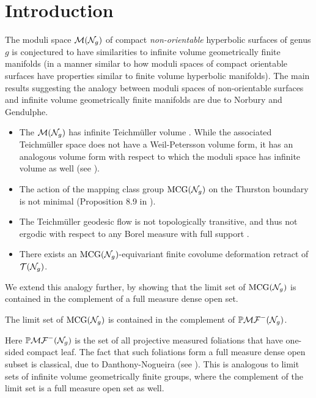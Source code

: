 \section{Introduction}
\label{sec:introduction-v2}

The moduli space $\mathcal{M}(\mathcal{N}_g)$ of compact \emph{non-orientable} hyperbolic surfaces of genus $g$ is conjectured to have similarities to infinite volume geometrically finite manifolds (in a manner similar to how moduli spaces of compact orientable surfaces have properties similar to finite volume hyperbolic manifolds).
The main results suggesting the analogy between moduli spaces of non-orientable surfaces and infinite volume geometrically finite manifolds are due to Norbury and Gendulphe.

\begin{itemize}
\item The $\mathcal{M}(\mathcal{N}_g)$ has infinite Teichm\"uller volume \cite[Theorem 17.1]{gendulphe2017whats}.
  While the associated Teichm\"uller space does not have a Weil-Petersson volume form, it has an analogous volume form with respect to which the moduli space has infinite volume as well (see \cite{norbury2008lengths}).
\item The action of the mapping class group $\mathrm{MCG}(\mathcal{N}_g)$ on the Thurston boundary is not minimal (Proposition 8.9 in \cite{gendulphe2017whats}).
\item The Teichm\"uller geodesic flow is not topologically transitive, and thus not ergodic with respect to any Borel measure with full support \cite[Proposition 17.5]{gendulphe2017whats}.
\item There exists an $\mathrm{MCG}(\mathcal{N}_g)$-equivariant finite covolume deformation retract of $\mathcal{T}(\mathcal{N}_g)$.
\end{itemize}

We extend this analogy further, by showing that the limit set of $\mathrm{MCG}(\mathcal{N}_g)$ is contained in the complement of a full measure dense open set.
\begingroup
\def\thetheorem{\ref{cor:geolimset}}
\begin{theorem}
  The limit set of $\mathrm{MCG}(\mathcal{N}_g)$ is contained in the complement of $\mathbb{P}\mathcal{MF}^-(\mathcal{N}_g)$.
\end{theorem}
\addtocounter{theorem}{-1}
\endgroup
Here $\mathbb{P}\mathcal{MF}^-(\mathcal{N}_g)$ is the set of all projective measured foliations that have one-sided compact leaf.
The fact that such foliations form a full measure dense open subset is classical, due to Danthony-Nogueira (see \cite{ASENS_1990_4_23_3_469_0}).
This is analogous to limit sets of infinite volume geometrically finite groups, where the complement of the limit set is a full measure open set as well.

